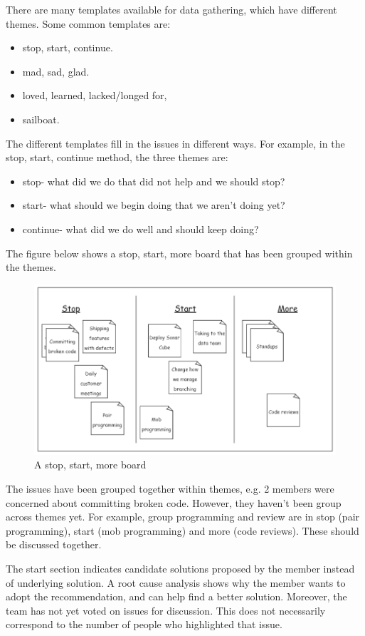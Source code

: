 \documentclass[a4paper, openany]{memoir}
\begin{document}
There are many templates available for data gathering, which have different themes. Some common templates are:
\begin{itemize}
    \item stop, start, continue.
    \item mad, sad, glad.
    \item loved, learned, lacked/longed for,
    \item sailboat.
\end{itemize}
The different templates fill in the issues in different ways. For example, in the stop, start, continue method, the three themes are:
\begin{itemize}
    \item stop- what did we do that did not help and we should stop?
    \item start- what should we begin doing that we aren't doing yet?
    \item continue- what did we do well and should keep doing?
\end{itemize}
The figure below shows a stop, start, more board that has been grouped within the themes.
\begin{figure}[H]
    \centering
    \includegraphics[scale=0.5]{src/6 stop start more.PNG}
    \caption{A stop, start, more board}
\end{figure}
\noindent The issues have been grouped together within themes, e.g. 2 members were concerned about committing broken code. However, they haven't been group across themes yet. For example, group programming and review are in stop (pair programming), start (mob programming) and more (code reviews). These should be discussed together.

The start section indicates candidate solutions proposed by the member instead of underlying solution. A root cause analysis shows why the member wants to adopt the recommendation, and can help find a better solution. Moreover, the team has not yet voted on issues for discussion. This does not necessarily correspond to the number of people who highlighted that issue.
\end{document}
